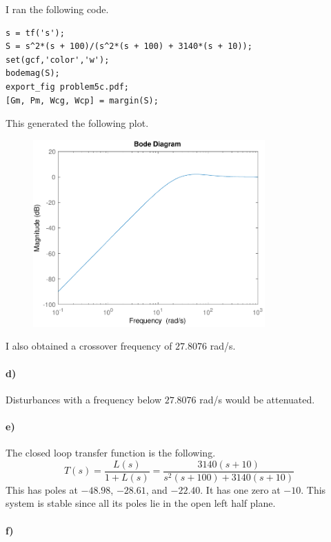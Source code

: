 \documentclass[12pt]{article}
\begin{document}
I ran the following code.
\begin{verbatim}
s = tf('s');
S = s^2*(s + 100)/(s^2*(s + 100) + 3140*(s + 10));
set(gcf,'color','w');
bodemag(S);
export_fig problem5c.pdf;
[Gm, Pm, Wcg, Wcp] = margin(S);
\end{verbatim}
This generated the following plot.
\begin{figure}[H]
    \begin{center}
        \includegraphics[width=3.5in]{problem5c.pdf}
    \end{center}
\end{figure}
I also obtained a crossover frequency of \(27.8076\) rad/s.

\paragraph{d)}

Disturbances with a frequency below \(27.8076\) rad/s would be attenuated.

\paragraph{e)}

The closed loop transfer function is the following.
\[T(s)=\frac{L(s)}{1+L(s)}=\frac{3140(s+10)}{s^2(s+100)+3140(s+10)}\]
This has poles at \(-48.98\), \(-28.61\), and \(-22.40\). It has one
zero at \(-10\). This system is stable since all its poles lie in the
open left half plane.

\paragraph{f)}
\end{document}
